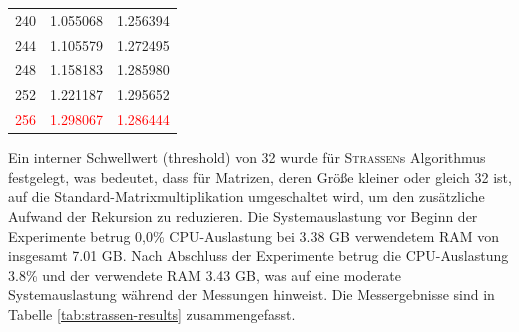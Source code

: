 \documentclass{scrartcl}
\begin{document}
\begin{table}[h!]
\begin{tabular}{c|m{3.3cm}|m{3.3cm}}
		240 & 1.055068 & 1.256394 \\ 
		244 & 1.105579 & 1.272495 \\ 
		248 & 1.158183 & 1.285980 \\ 
		252 & 1.221187 & 1.295652 \\ 
		\textcolor{red}{256} & \textcolor{red}{1.298067} & \textcolor{red}{1.286444} \\
		\hline
	\end{tabular}
\end{table}
Ein interner Schwellwert (threshold) von 32 wurde für \textsc{Strassen}s Algorithmus festgelegt, was bedeutet, dass für Matrizen, deren Größe kleiner oder gleich 32 ist, auf die Standard-Matrixmultiplikation umgeschaltet wird, um den zusätzliche Aufwand der Rekursion zu reduzieren. Die Systemauslastung vor Beginn der Experimente betrug 0,0\% CPU-Auslastung bei 3.38 GB verwendetem RAM von insgesamt 7.01 GB. Nach Abschluss der Experimente betrug die CPU-Auslastung 3.8\% und der verwendete RAM 3.43 GB, was auf eine moderate Systemauslastung während der Messungen hinweist. Die Messergebnisse sind in Tabelle \ref{tab:strassen-results} zusammengefasst.
\end{document}
